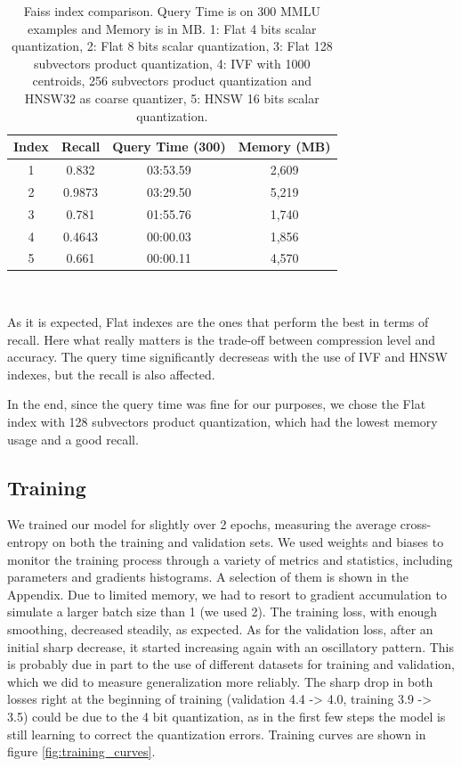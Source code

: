 \documentclass[11pt]{article}
\begin{document}
\begin{table}[h]
\centering
\begin{tabular}{|c|c|c|c|}
\hline
Index & Recall & Query Time (300) & Memory (MB) \\
\hline
1 & 0.832 & 03:53.59 & 2,609 \\
2 & 0.9873 & 03:29.50 & 5,219 \\
3 & 0.781 & 01:55.76 & 1,740 \\
4 & 0.4643 & 00:00.03 & 1,856 \\
5 & 0.661 & 00:00.11 & 4,570 \\
\hline
\end{tabular}
\caption{Faiss index comparison. Query Time is on 300 MMLU examples and Memory is in MB. 1: Flat 4 bits scalar quantization, 2: Flat 8 bits scalar quantization, 3: Flat 128 subvectors product quantization, 4: IVF with 1000 centroids, 256 subvectors product quantization and HNSW32 as coarse quantizer, 5: HNSW 16 bits scalar quantization.}
\
\label{tab:faiss-index}
\end{table}

As it is expected, Flat indexes are the ones that perform the best in terms of recall.
Here what really matters is the trade-off between compression level and accuracy.
The query time significantly decreseas with the use of IVF and HNSW indexes, but the recall
is also affected.

In the end, since the query time was fine for our purposes, we chose the Flat index with 128
subvectors product quantization, which had the lowest memory usage and a good recall.

\subsection{Training}

We trained our model for slightly over 2 epochs, measuring the average cross-entropy on both the training and validation sets. We used weights
and biases to monitor the training process through a variety of metrics and statistics, including parameters and gradients histograms. A selection of them 
is shown in the Appendix.
Due to limited memory, we had to resort to gradient accumulation to simulate a larger batch size than 1 (we used 2). The training loss, 
with enough smoothing, decreased steadily, as expected. As for the validation loss, after an initial sharp decrease, it started increasing
again with an oscillatory pattern. This is probably due in part to the use of different datasets for training and validation, which we did
to measure generalization more reliably. The sharp drop in both losses right at the beginning of training (validation 4.4 -> 4.0, training 3.9 -> 3.5) could be due to
 the 4 bit quantization, as in the first few steps the model is still learning to correct the quantization errors. Training curves are shown in figure \ref{fig:training_curves}.
\end{document}
